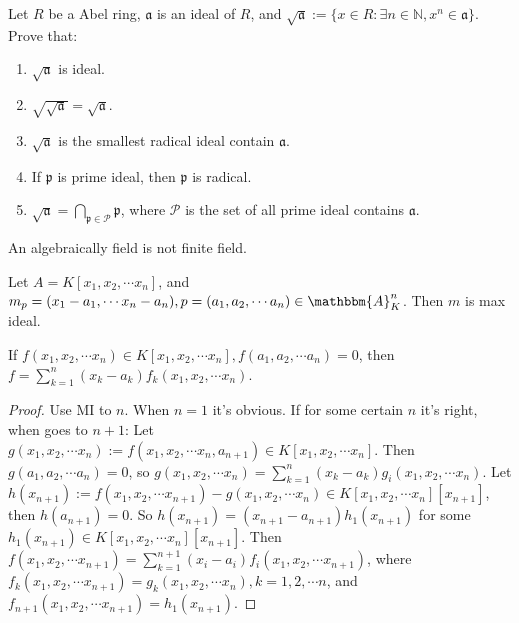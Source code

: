 \documentclass{ctexart}
\newif\ifpreface
\renewcommand{\theproblem}{\Roman{problem}}
\newcommand\<{\langle}
\renewcommand\>{\rangle}
\newcommand\N{\mathbb{N}}
\newcommand{\A}{\mathbbm{A}}
\newcommand{\fra}{\mathfrak{a}}
\begin{document}
\large
\setlength{\baselineskip}{1.2em}
\ifpreface

\else
\maketitle
\fi
{}
\begin{problem}
Let $R$ be a Abel ring, $\fra$ is an ideal of $R$, and $\sqrt{\fra}:=\{x\in R:\exists n\in\N,x^n\in\fra\}$. Prove that:
\begin{enumerate}[ref=\theproblem.\arabic*]
\item\label{it:11} $\sqrt{\mathfrak{a}}$ is ideal.
\item\label{it:12} $\sqrt{\sqrt{\mathfrak{a}}}=\sqrt{\mathfrak{a}}$.
\item\label{it:13} $\sqrt{\fra}$ is the smallest radical ideal contain $\mathfrak{a}$. 
\item\label{it:14} If $\mathfrak{p}$ is prime ideal, then $\mathfrak{p}$ is radical. 
\item\label{it:15} $\sqrt{\mathfrak{a}}=\bigcap_{\mathfrak{p}\in\mathcal{P}}\mathfrak{p}$, where $\mathcal{P}$ is the set of all prime ideal contains $\fra$. 
\end{enumerate}
\end{problem}


\begin{problem}
An algebraically field is not finite field. 
\end{problem}
\begin{problem}
Let $A=K[x_1,x_2,\cdots x_n]$, and $m_p=(x_1-a_1,\cdots x_n-a_n),p=(a_1,a_2,\cdots a_n)\in\A_K^n$. Then $m$ is max ideal.
\end{problem}
\begin{lemma}
\label{lem:ker}
If $f(x_1,x_2,\cdots x_n)\in K[x_1,x_2,\cdots x_n],f(a_1,a_2,\cdots a_n)=0$, then $f=\sum_{k=1}^n (x_k-a_k)f_k(x_1,x_2,\cdots x_n)$. 
\end{lemma}
\begin{proof}
Use MI to $n$. When $n=1$ it's obvious. If for some certain $n$ it's right, when goes to $n+1$: Let $g(x_1,x_2,\cdots x_n):=f(x_1,x_2,\cdots x_n,a_{n+1})\in K[x_1,x_2,\cdots x_n]$. Then $g(a_1,a_2,\cdots a_n)=0$, so $g(x_1,x_2,\cdots x_n)=\sum_{k=1}^n (x_k-a_k)g_i(x_1,x_2,\cdots x_n)$. Let $h(x_{n+1}):=f(x_1,x_2,\cdots x_{n+1})-g(x_1,x_2,\cdots x_n)\in K[x_1,x_2,\cdots x_n][x_{n+1}]$, then $h(a_{n+1})=0$. So $h(x_{n+1})=(x_{n+1}-a_{n+1})h_1(x_{n+1})$ for some $h_1(x_{n+1})\in K[x_1,x_2,\cdots x_n][x_{n+1}]$. Then $f(x_1,x_2,\cdots x_{n+1})=\sum_{k=1}^{n+1}(x_{i}-a_i)f_i(x_1,x_2,\cdots x_{n+1})$, where $f_k(x_1,x_2,\cdots x_{n+1})=g_k(x_1,x_2,\cdots x_n),k=1,2,\cdots n$, and $f_{n+1}(x_1,x_2,\cdots x_{n+1})=h_1(x_{n+1})$. 
\end{proof}
\end{document}
